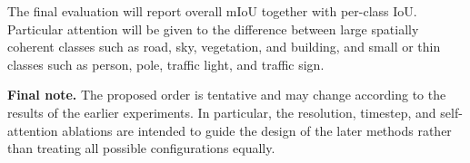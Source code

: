 \documentclass[11pt,a4paper]{article}
\begin{document}
The final evaluation will report overall mIoU together with per-class IoU.
Particular attention will be given to the difference between large spatially coherent
classes such as road, sky, vegetation, and building, and small or thin classes such as
person, pole, traffic light, and traffic sign.

\textbf{Final note.}
The proposed order is tentative and may change according to the results of the
earlier experiments. In particular, the resolution, timestep, and self-attention
ablations are intended to guide the design of the later methods rather than treating
all possible configurations equally.
\end{document}
